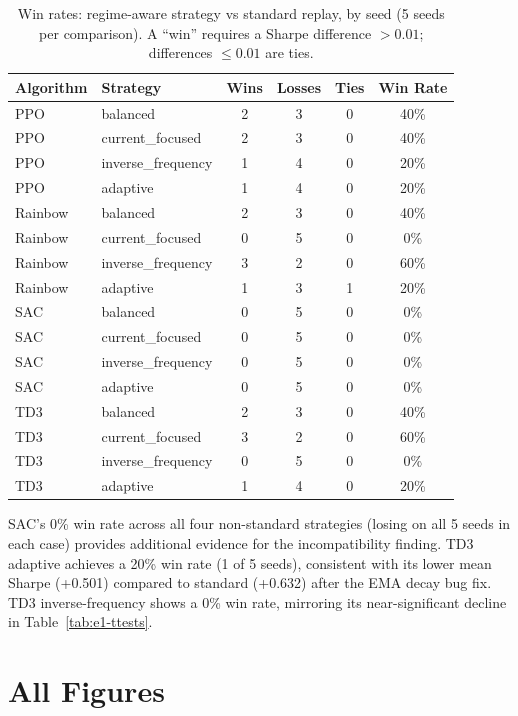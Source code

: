 \documentclass[11pt,a4paper]{article}
\begin{document}
\begin{table}[H]
\centering
\small
\caption{Win rates: regime-aware strategy vs standard replay, by seed (5 seeds per comparison). A ``win'' requires a Sharpe difference $> 0.01$; differences $\leq 0.01$ are ties.}
\label{tab:win-rates}
\begin{tabular}{@{}llcccc@{}}
\toprule
\textbf{Algorithm} & \textbf{Strategy} & \textbf{Wins} & \textbf{Losses} & \textbf{Ties} & \textbf{Win Rate} \\
\midrule
PPO & balanced & 2 & 3 & 0 & 40\% \\
PPO & current\_focused & 2 & 3 & 0 & 40\% \\
PPO & inverse\_frequency & 1 & 4 & 0 & 20\% \\
PPO & adaptive & 1 & 4 & 0 & 20\% \\
\midrule
Rainbow & balanced & 2 & 3 & 0 & 40\% \\
Rainbow & current\_focused & 0 & 5 & 0 & 0\% \\
Rainbow & inverse\_frequency & 3 & 2 & 0 & 60\% \\
Rainbow & adaptive & 1 & 3 & 1 & 20\% \\
\midrule
SAC & balanced & 0 & 5 & 0 & 0\% \\
SAC & current\_focused & 0 & 5 & 0 & 0\% \\
SAC & inverse\_frequency & 0 & 5 & 0 & 0\% \\
SAC & adaptive & 0 & 5 & 0 & 0\% \\
\midrule
TD3 & balanced & 2 & 3 & 0 & 40\% \\
TD3 & current\_focused & 3 & 2 & 0 & 60\% \\
TD3 & inverse\_frequency & 0 & 5 & 0 & 0\% \\
TD3 & adaptive & 1 & 4 & 0 & 20\% \\
\bottomrule
\end{tabular}
\end{table}

SAC's 0\% win rate across all four non-standard strategies (losing on all 5 seeds in each case) provides additional evidence for the incompatibility finding. TD3 adaptive achieves a 20\% win rate (1 of 5 seeds), consistent with its lower mean Sharpe (+0.501) compared to standard (+0.632) after the EMA decay bug fix. TD3 inverse-frequency shows a 0\% win rate, mirroring its near-significant decline in Table~\ref{tab:e1-ttests}.


\section{All Figures}
\label{app:figures}
\end{document}
